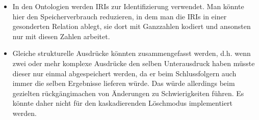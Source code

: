 \begin{itemize}
  \item In den Ontologien werden IRIs zur Identifizierung verwendet. Man könnte hier den Speicherverbrauch reduzieren, in dem man die IRIs in einer gesonderten Relation ablegt, sie dort mit Ganzzahlen kodiert und ansonsten nur mit diesen Zahlen arbeitet.
  \item Gleiche strukturelle Ausdrücke könnten zusammengefasst werden, d.h. wenn zwei oder mehr komplexe Ausdrücke den selben Unterausdruck haben müsste dieser nur einmal abgespeichert werden, da er beim Schlussfolgern auch immer die selben Ergebnisse lieferen würde. Das würde allerdings beim gezielten rückgängimachen von Änderungen zu Schwierigkeiten führen. Es könnte daher nicht für den kaskadierenden Löschmodus implementiert werden.
\end{itemize}